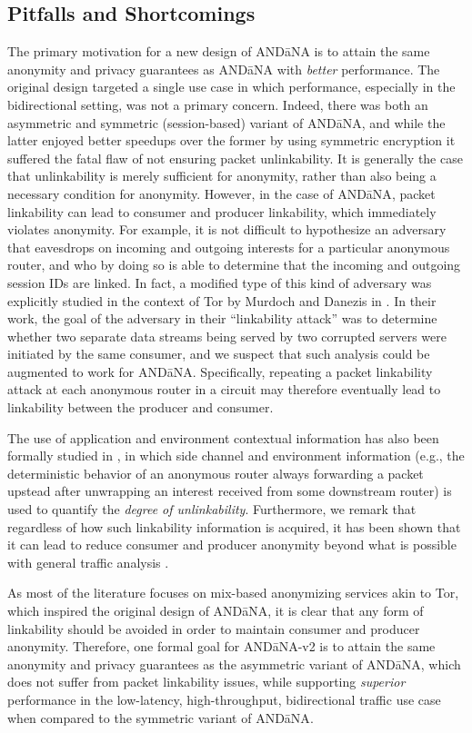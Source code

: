 \subsection{Pitfalls and Shortcomings}
The primary motivation for a new design of {\sf AND\=aNA} is to attain the same anonymity and privacy guarantees as {\sf AND\=aNA} with \emph{better} performance. The original design targeted a single use case in which performance, especially in the bidirectional setting, was not a primary concern. Indeed, there was both an asymmetric and symmetric (session-based) variant of {\sf AND\=aNA}, and while the latter enjoyed better speedups over the former by using symmetric encryption it suffered the fatal flaw of not ensuring packet unlinkability. It is generally the case that unlinkability is merely sufficient for anonymity, rather than also being a necessary condition for anonymity. However, in the case of {\sf AND\=aNA}, packet linkability can lead to consumer and producer linkability, which immediately violates anonymity. For example, it is not difficult to hypothesize an adversary that eavesdrops on incoming and outgoing interests for a particular anonymous router, and who by doing so is able to determine that the incoming and outgoing session IDs are linked. In fact, a modified type of this kind of adversary was explicitly studied in the context of Tor by Murdoch and Danezis in \cite{tor-traffic-analysis}. In their work, the goal of the adversary in their ``linkability attack'' was to determine whether two separate data streams being served by two corrupted servers were initiated by the same consumer, and we suspect that such analysis could be augmented to work for {\sf AND\=aNA}. Specifically, repeating a packet linkability attack at each anonymous router in a circuit may therefore eventually lead to linkability between the producer and consumer. 

The use of application and environment contextual information has also been formally studied in \cite{attacking-unlinkability}, in which side channel and environment information (e.g., the deterministic behavior of an anonymous router always forwarding a packet upstead after unwrapping an interest received from some downstream router) is used to quantify the \emph{degree of unlinkability}. Furthermore, we remark that regardless of how such linkability information is acquired, it has been shown that it can lead to reduce consumer and producer anonymity beyond what is possible with general traffic analysis \cite{linkability-attacks}. 

As most of the literature focuses on mix-based anonymizing services akin to Tor, which inspired the original design of {\sf AND\=aNA}, it is clear that any form of linkability should be avoided in order to maintain consumer and producer anonymity. Therefore, one formal goal for {\sf AND\=aNA-v2} is to attain the same anonymity and privacy guarantees as the asymmetric variant of {\sf AND\=aNA}, which does not suffer from packet linkability issues, while supporting \emph{superior} performance in the low-latency, high-throughput, bidirectional traffic use case when compared to the symmetric variant of {\sf AND\=aNA}.
